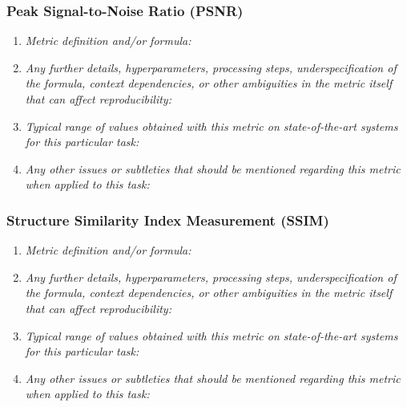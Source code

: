 \documentclass[a4paper,11pt]{article}
\begin{document}
        \subsubsection{Peak Signal-to-Noise Ratio (PSNR)}
            \begin{enumerate}[label=\alph*.]
                \item \textit{Metric definition and/or formula:}
                \bigskip
                \item \textit{Any further details, hyperparameters, processing steps, underspecification of the formula, context dependencies, or other ambiguities in the metric itself that can affect reproducibility:}
                \bigskip
                \item \textit{Typical range of values obtained with this metric on state-of-the-art systems for this particular task:}
                \bigskip
                \item \textit{Any other issues or subtleties that should be mentioned regarding this metric when applied to this task:}
                \bigskip
            \end{enumerate}
        \subsubsection{Structure Similarity Index Measurement (SSIM)}
            \begin{enumerate}[label=\alph*.]
                \item \textit{Metric definition and/or formula:}
                \bigskip
                \item \textit{Any further details, hyperparameters, processing steps, underspecification of the formula, context dependencies, or other ambiguities in the metric itself that can affect reproducibility:}
                \bigskip
                \item \textit{Typical range of values obtained with this metric on state-of-the-art systems for this particular task:}
                \bigskip
                \item \textit{Any other issues or subtleties that should be mentioned regarding this metric when applied to this task:}
                \bigskip
            \end{enumerate}
\end{document}
